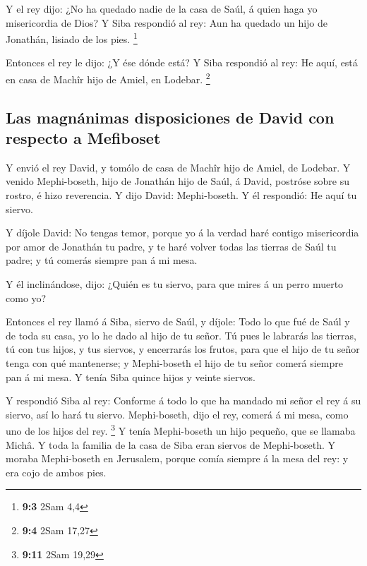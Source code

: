  Y el rey dijo: ¿No ha quedado nadie de la casa de Saúl, á
quien haga yo misericordia de Dios? Y Siba respondió al rey: Aun ha
quedado un hijo de Jonathán, lisiado de los pies. \footnote{\textbf{9:3}
  2Sam 4,4}

 Entonces el rey le dijo: ¿Y ése dónde está? Y Siba
respondió al rey: He aquí, está en casa de Machîr hijo de Amiel, en
Lodebar. \footnote{\textbf{9:4} 2Sam 17,27}

\hypertarget{las-magnuxe1nimas-disposiciones-de-david-con-respecto-a-mefiboset}{%
\subsection{Las magnánimas disposiciones de David con respecto a
Mefiboset}\label{las-magnuxe1nimas-disposiciones-de-david-con-respecto-a-mefiboset}}

 Y envió el rey David, y tomólo de casa de Machîr hijo de
Amiel, de Lodebar.  Y venido Mephi-boseth, hijo de Jonathán
hijo de Saúl, á David, postróse sobre su rostro, é hizo reverencia. Y
dijo David: Mephi-boseth. Y él respondió: He aquí tu siervo.

 Y díjole David: No tengas temor, porque yo á la verdad haré
contigo misericordia por amor de Jonathán tu padre, y te haré volver
todas las tierras de Saúl tu padre; y tú comerás siempre pan á mi mesa.

 Y él inclinándose, dijo: ¿Quién es tu siervo, para que
mires á un perro muerto como yo?

 Entonces el rey llamó á Siba, siervo de Saúl, y díjole:
Todo lo que fué de Saúl y de toda su casa, yo lo he dado al hijo de tu
señor.  Tú pues le labrarás las tierras, tú con tus hijos,
y tus siervos, y encerrarás los frutos, para que el hijo de tu señor
tenga con qué mantenerse; y Mephi-boseth el hijo de tu señor comerá
siempre pan á mi mesa. Y tenía Siba quince hijos y veinte siervos.

 Y respondió Siba al rey: Conforme á todo lo que ha mandado
mi señor el rey á su siervo, así lo hará tu siervo. Mephi-boseth, dijo
el rey, comerá á mi mesa, como uno de los hijos del rey. \footnote{\textbf{9:11}
  2Sam 19,29}  Y tenía Mephi-boseth un hijo pequeño, que se
llamaba Michâ. Y toda la familia de la casa de Siba eran siervos de
Mephi-boseth.  Y moraba Mephi-boseth en Jerusalem, porque
comía siempre á la mesa del rey: y era cojo de ambos pies.

